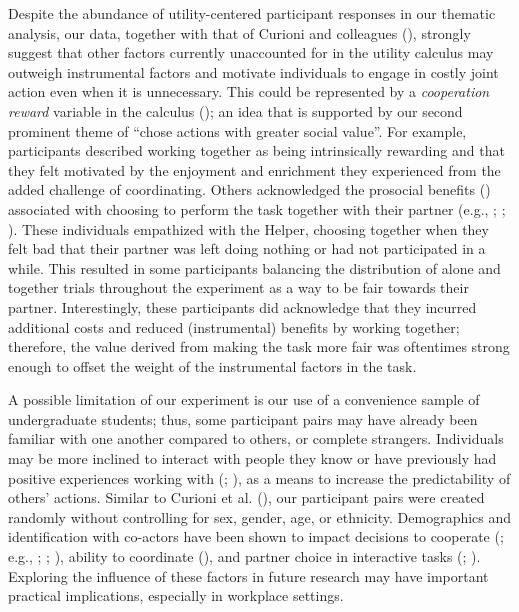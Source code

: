 \documentclass[
  man,
  floatsintext,
  longtable,
  nolmodern,
  notxfonts,
  notimes,
  mask,
  colorlinks=true,linkcolor=blue,citecolor=blue,urlcolor=blue]{apa7}
\begin{document}
Despite the abundance of utility-centered participant responses in our
thematic analysis, our data, together with that of Curioni and
colleagues (), strongly suggest that
other factors currently unaccounted for in the utility calculus may
outweigh instrumental factors and motivate individuals to engage in
costly joint action even when it is unnecessary. This could be
represented by a \emph{cooperation reward} variable in the calculus
(); an idea that is
supported by our second prominent theme of ``chose actions with greater
social value''. For example, participants described working together as
being intrinsically rewarding and that they felt motivated by the
enjoyment and enrichment they experienced from the added challenge of
coordinating. Others acknowledged the prosocial benefits
() associated with
choosing to perform the task together with their partner (e.g.,
;
;
). These
individuals empathized with the Helper, choosing together when they felt
bad that their partner was left doing nothing or had not participated in
a while. This resulted in some participants balancing the distribution
of alone and together trials throughout the experiment as a way to be
fair towards their partner. Interestingly, these participants did
acknowledge that they incurred additional costs and reduced
(instrumental) benefits by working together; therefore, the value
derived from making the task more fair was oftentimes strong enough to
offset the weight of the instrumental factors in the task.

A possible limitation of our experiment is our use of a convenience
sample of undergraduate students; thus, some participant pairs may have
already been familiar with one another compared to others, or complete
strangers. Individuals may be more inclined to interact with people they
know or have previously had positive experiences working with
(;
), as a means to
increase the predictability of others' actions. Similar to Curioni et
al. (), our participant pairs were
created randomly without controlling for sex, gender, age, or ethnicity.
Demographics and identification with co-actors have been shown to impact
decisions to cooperate (;
e.g., ;
;
), ability to coordinate
(), and partner
choice in interactive tasks (; ). Exploring
the influence of these factors in future research may have important
practical implications, especially in workplace settings.
\end{document}
